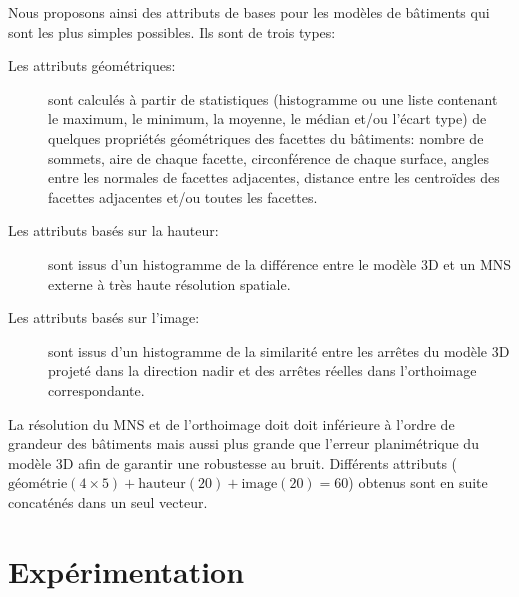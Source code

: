         Nous proposons ainsi des attributs de bases pour les modèles de bâtiments qui sont les plus simples possibles.
        Ils sont de trois types:
        \begin{description}
            \item[Les attributs géométriques: ] sont calculés à partir de statistiques (histogramme ou une liste contenant le maximum, le minimum, la moyenne, le médian et/ou l'écart type) de quelques propriétés géométriques des facettes du bâtiments: nombre de sommets, aire de chaque facette, circonférence de chaque surface, angles entre les normales de facettes adjacentes, distance entre les centroïdes des facettes adjacentes et/ou toutes les facettes.
            \item[Les attributs basés sur la hauteur: ] sont issus d'un histogramme de la différence entre le modèle 3D et un MNS externe à très haute résolution spatiale.
            \item[Les attributs basés sur l'image: ] sont issus d'un histogramme de la similarité entre les arrêtes du modèle 3D projeté dans la direction nadir et des arrêtes réelles dans l'orthoimage correspondante.
        \end{description}

        La résolution du MNS et de l'orthoimage doit doit inférieure à l'ordre de grandeur des bâtiments mais aussi plus grande que l'erreur planimétrique du modèle 3D afin de garantir une robustesse au bruit.
        Différents attributs (\(\text{géométrie}(4\times5) + \text{hauteur}(20) + \text{image}(20) = 60\)) obtenus sont en suite concaténés dans un seul vecteur.
\section*{Expérimentation}

